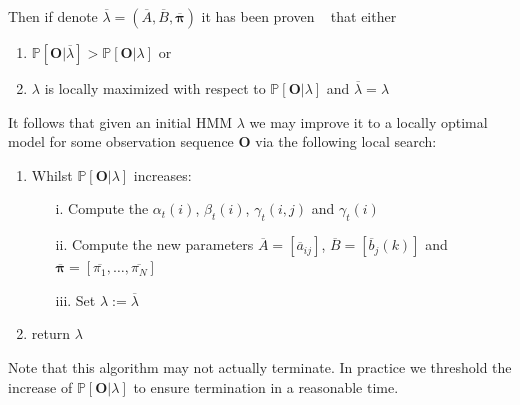 Then if denote $\overline{\lambda} = (\overline{A},\overline{B},\overline{\bm{\pi}})$ it has been proven ~\citep{levinson1983introduction, baum1968growth} that either
\begin{enumerate}
\item $\mathbb{P}[\bm{O}|\overline{\lambda}] > \mathbb{P}[\bm{O}|\lambda]$ or
\item $\lambda$ is locally maximized with respect to $\mathbb{P}[\bm{O}|\lambda]$ and $\overline{\lambda} = \lambda$
\end{enumerate}
It follows that given an initial HMM $\lambda$ we may improve it to a locally optimal model for some observation sequence $\bm{O}$ via the following local search:
\begin{enumerate}
\item Whilst $\mathbb{P}[\bm{O}|\lambda]$ increases:
	\begin{enumerate}
		\item[i.] Compute the $\alpha_t(i)$, $\beta_t(i)$, $\gamma_t(i,j)$ and $\gamma_t(i)$
		\item[ii.] Compute the new parameters $\overline{A} = [\overline{a}_{ij}]$, $\overline{B} = [\overline{b}_j(k)]$ and $\overline{\bm{\pi}} = [\overline{\pi_1}, \dots, \overline{\pi_N}]$
		\item[iii.] Set $\lambda := \overline{\lambda}$
	\end{enumerate}
\item return $\lambda$
\end{enumerate}
Note that this algorithm may not actually terminate. In practice we threshold the increase of $\mathbb{P}[\bm{O}|\lambda]$ to ensure termination in a reasonable time. 

